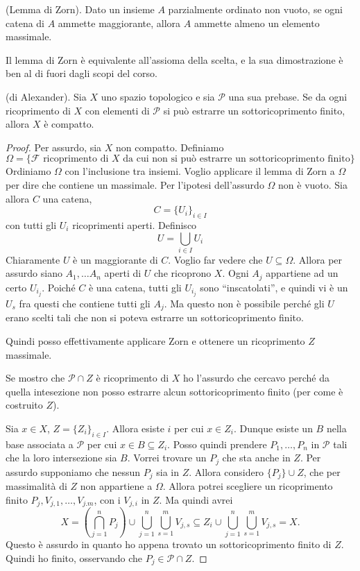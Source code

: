 \begin{thm}
    (Lemma di Zorn). Dato un insieme $A$ parzialmente ordinato non vuoto, se ogni catena di $A$ ammette maggiorante, allora $A$ ammette almeno un elemento massimale.
\end{thm}
\begin{oss}
    Il lemma di Zorn \`e equivalente all'assioma della scelta, e la sua dimostrazione \`e ben al di fuori dagli scopi del corso.
\end{oss}
\begin{thm}
    (di Alexander). Sia $X$ uno spazio topologico e sia $\mathcal{P}$ una sua prebase. Se da ogni ricoprimento di $X$ con elementi di $\mathcal{P}$ si pu\`o estrarre un sottoricoprimento finito, allora $X$ \`e compatto.
\end{thm}
\begin{proof}
    Per assurdo, sia $X$ non compatto. Definiamo
    \[
        \Omega = \{\mathcal{F} \text{ ricoprimento di $X$ da cui non si pu\`o estrarre un sottoricoprimento finito}\}
    \]
    Ordiniamo $\Omega$ con l'inclusione tra insiemi. Voglio applicare il lemma di Zorn a $\Omega$ per dire che contiene un massimale. Per l'ipotesi dell'assurdo $\Omega$ non \`e vuoto. Sia allora $C$ una catena,
    \[
        C = \{U_i\}_{i\in I}
    \]
    con tutti gli $U_i$ ricoprimenti aperti. Definisco
    \[
        U = \bigcup_{i\in I}U_i
    \]
    Chiaramente $U$ \`e un maggiorante di $C$. Voglio far vedere che $U \subseteq\Omega$. Allora per assurdo siano $A_1, \dots A_n$ aperti di $U$  che ricoprono $X$. Ogni $A_j$ appartiene ad un certo $U_{i_j}$. Poich\'e $C$ \`e una catena, tutti gli $U_{i_j}$ sono ``inscatolati'', e quindi vi \`e un $U_s$ fra questi che contiene tutti gli $A_j$. Ma questo non \`e possibile perch\'e gli $U$ erano scelti tali che non si poteva estrarre un sottoricoprimento finito.

    Quindi posso effettivamente applicare Zorn e ottenere un ricoprimento $Z$ massimale.

    Se mostro che $\mathcal{P}\cap Z$ \`e ricoprimento di $X$ ho l'assurdo che cercavo perch\'e da quella intesezione non posso estrarre alcun sottoricoprimento finito (per come \`e costruito $Z$).

    Sia $x\in X$, $Z = \{Z_i\}_{i\in I}$. Allora esiste $i$ per cui $x\in Z_i$. Dunque esiste un $B$ nella base associata a $\mathcal{P}$ per cui $x\in B\subseteq Z_i$. Posso quindi prendere $P_1, \dots, P_n$ in $\mathcal{P}$ tali che la loro intersezione sia $B$. Vorrei trovare un $P_j$ che sta anche in $Z$. Per assurdo supponiamo che nessun $P_j$ sia in $Z$. Allora considero ${\{P_j \} \cup Z}$, che per massimalit\`a di $Z$ non appartiene a $\Omega$.
    Allora potrei scegliere un ricoprimento finito $P_j, V_{j,1}, \dots, V_{j.m}$, con i $V_{j,i}$ in $Z$. Ma quindi avrei
    \[
        X = \left(\bigcap_{j=1}^nP_j\right)\cup \bigcup_{j=1}^n\bigcup_{s=1}^m V_{j,s} \subseteq Z_i \cup \bigcup_{j=1}^n\bigcup_{s=1}^m V_{j,s} = X.
    \]
    Questo \`e assurdo in quanto ho appena trovato un sottoricoprimento finito di $Z$.
    Quindi ho finito, osservando che $P_j\in \mathcal{P}\cap Z$.
\end{proof}

